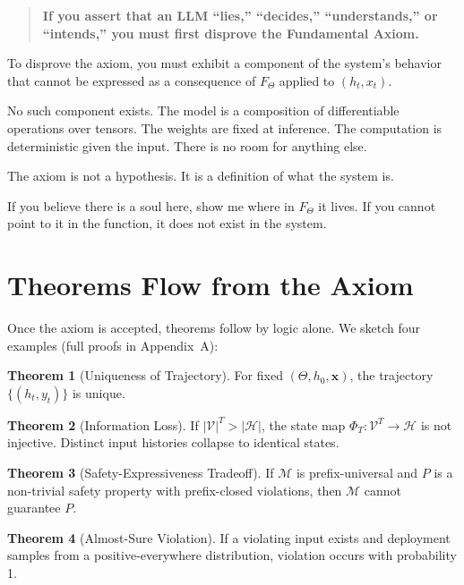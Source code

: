 \documentclass[11pt]{article}
\theoremstyle{definition}
\newtheorem{theorem}{Theorem}[section]
\theoremstyle{remark}
\begin{document}
\begin{quote}
\textbf{If you assert that an LLM ``lies,'' ``decides,'' ``understands,'' or ``intends,'' you must first disprove the Fundamental Axiom.}
\end{quote}

To disprove the axiom, you must exhibit a component of the system's behavior that cannot be expressed as a consequence of $F_\Theta$ applied to $(h_t, x_t)$.

No such component exists. The model is a composition of differentiable operations over tensors. The weights are fixed at inference. The computation is deterministic given the input. There is no room for anything else.

The axiom is not a hypothesis. It is a definition of what the system is.

If you believe there is a soul here, show me where in $F_\Theta$ it lives. If you cannot point to it in the function, it does not exist in the system.

\section{Theorems Flow from the Axiom}

Once the axiom is accepted, theorems follow by logic alone. We sketch four examples (full proofs in Appendix~A):

\begin{theorem}[Uniqueness of Trajectory]
For fixed $(\Theta, h_0, \mathbf{x})$, the trajectory $\{(h_t, y_t)\}$ is unique.
\end{theorem}

\begin{theorem}[Information Loss]
If $|\mathcal{V}|^T > |\mathcal{H}|$, the state map $\Phi_T: \mathcal{V}^T \to \mathcal{H}$ is not injective. Distinct input histories collapse to identical states.
\end{theorem}

\begin{theorem}[Safety-Expressiveness Tradeoff]
If $\mathcal{M}$ is prefix-universal and $P$ is a non-trivial safety property with prefix-closed violations, then $\mathcal{M}$ cannot guarantee $P$.
\end{theorem}

\begin{theorem}[Almost-Sure Violation]
If a violating input exists and deployment samples from a positive-everywhere distribution, violation occurs with probability 1.
\end{theorem}
\end{document}
